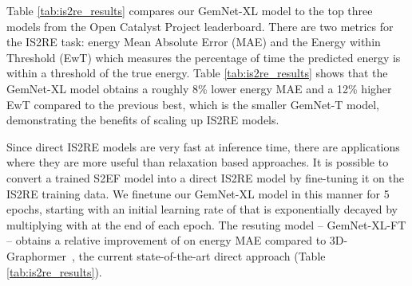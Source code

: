 \documentclass{article} \usepackage{iclr2022_conference,times}
\begin{document}
Table \ref{tab:is2re_results} compares our GemNet-XL model to the top three models from the Open Catalyst Project leaderboard. There are two metrics for the IS2RE task: energy Mean Absolute Error (MAE) and the Energy within Threshold (EwT) which measures the percentage of time the predicted energy is within a threshold of the true energy. Table \ref{tab:is2re_results} shows that the GemNet-XL model obtains a roughly 8\% lower energy MAE and a 12\% higher EwT compared to the previous best, which is the smaller GemNet-T model, demonstrating the benefits of scaling up IS2RE models.

Since direct IS2RE models are very fast at inference time, there are applications where they are more useful than relaxation based approaches.
It is possible to convert a trained S2EF model into a direct IS2RE model by fine-tuning it on the IS2RE training data. We finetune our GemNet-XL model in this manner for 5 epochs, starting with an initial learning rate of  that is exponentially decayed by multiplying with  at the end of each epoch. The resuting model -- GemNet-XL-FT -- obtains a relative improvement of  on energy MAE compared to
3D-Graphormer~\citep{graphormer}, the current state-of-the-art direct approach (Table \ref{tab:is2re_results}).




\begin{table*}[t]
    \centering
    \renewcommand{\arraystretch}{1.0}
    \setlength{\tabcolsep}{6pt}
    \caption{Model hyperparameters for the scaling analysis. ``\#GP GPUs'' denotes the number of GPUs over which the graph is distributed over for pure graph parallel training on a single node. ``\#GP+DP GPUs'' denotes the total number of GPUs used to train with graph parallel training together with 32-way data parallel training.}
    \label{tab:scaling_models}
    \vspace{-14pt}
\end{table*}
\end{document}
